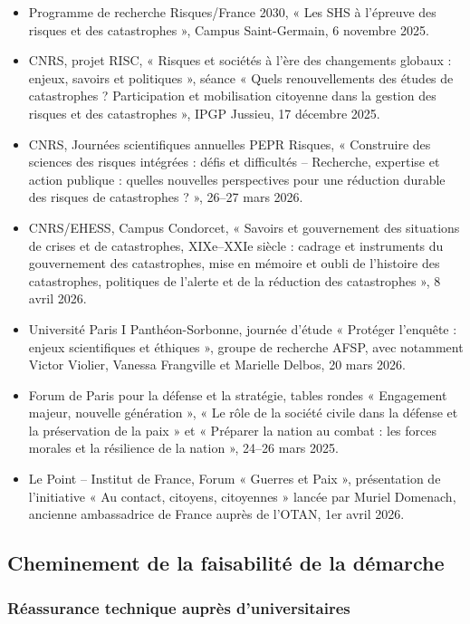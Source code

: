 \begin{itemize}[leftmargin=*]
    \item Programme de recherche Risques/France 2030, « Les SHS à l'épreuve des risques et des catastrophes », Campus Saint-Germain, 6 novembre 2025.
    \item CNRS, projet RISC, « Risques et sociétés à l'ère des changements globaux : enjeux, savoirs et politiques », séance « Quels renouvellements des études de catastrophes ? Participation et mobilisation citoyenne dans la gestion des risques et des catastrophes », IPGP Jussieu, 17 décembre 2025.
    \item CNRS, Journées scientifiques annuelles PEPR Risques, « Construire des sciences des risques intégrées : défis et difficultés -- Recherche, expertise et action publique : quelles nouvelles perspectives pour une réduction durable des risques de catastrophes ? », 26--27 mars 2026.
    \item CNRS/EHESS, Campus Condorcet, « Savoirs et gouvernement des situations de crises et de catastrophes, XIXe--XXIe siècle : cadrage et instruments du gouvernement des catastrophes, mise en mémoire et oubli de l'histoire des catastrophes, politiques de l'alerte et de la réduction des catastrophes », 8 avril 2026.
    \item Université Paris I Panthéon-Sorbonne, journée d'étude « Protéger l'enquête : enjeux scientifiques et éthiques », groupe de recherche AFSP, avec notamment Victor Violier, Vanessa Frangville et Marielle Delbos, 20 mars 2026.
    \item Forum de Paris pour la défense et la stratégie, tables rondes « Engagement majeur, nouvelle génération », « Le rôle de la société civile dans la défense et la préservation de la paix » et « Préparer la nation au combat : les forces morales et la résilience de la nation », 24--26 mars 2025.
    \item Le Point -- Institut de France, Forum « Guerres et Paix », présentation de l'initiative « Au contact, citoyens, citoyennes » lancée par Muriel Domenach, ancienne ambassadrice de France auprès de l'OTAN, 1er avril 2026.
\end{itemize}

\clearpage

\subsection*{Cheminement de la faisabilité de la démarche}

\subsubsection*{Réassurance technique auprès d'universitaires}


